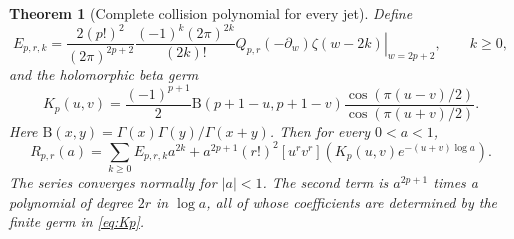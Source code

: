\documentclass[11pt]{article}
\numberwithin{equation}{section}
\newtheorem{theorem}{Theorem}[section]
\theoremstyle{definition}\newtheorem{definition}[theorem]{Definition}
\theoremstyle{remark}\newtheorem{remark}[theorem]{Remark}
\begin{document}
\begin{theorem}[Complete collision polynomial for every jet]
\label{thm:alljets}
Define
\begin{equation}\label{eq:Eprk}
 E_{p,r,k}=\frac{2(p!)^2}{(2\pi)^{2p+2}}
       \frac{(-1)^k(2\pi)^{2k}}{(2k)!}
       \left.Q_{p,r}(-\partial_w)\zeta(w-2k)\right|_{w=2p+2},
       \qquad k\ge0,
\end{equation}
and the holomorphic beta germ
\begin{equation}\label{eq:Kp}
 K_p(u,v)=\frac{(-1)^{p+1}}2
 \mathrm B(p+1-u,p+1-v)
 \frac{\cos(\pi(u-v)/2)}{\cos(\pi(u+v)/2)}.
\end{equation}
Here $\mathrm B(x,y)=\Gamma(x)\Gamma(y)/\Gamma(x+y)$.
Then for every $0<a<1$,
\begin{equation}\label{eq:alljetsexact}
 R_{p,r}(a)=\sum_{k\ge0}E_{p,r,k}a^{2k}
 +a^{2p+1}(r!)^2[u^rv^r]
                \left(K_p(u,v)e^{-(u+v)\log a}\right).
\end{equation}
The series converges normally for $|a|<1$. The second term is
$a^{2p+1}$ times a polynomial of degree $2r$ in $\log a$, all of whose
coefficients are determined by the finite germ in \eqref{eq:Kp}.
\end{theorem}
\end{document}
